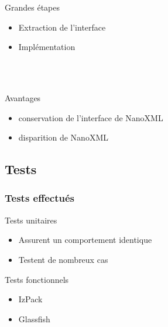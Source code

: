 \begin{frame}
\begin{minipage}[c]{.6\linewidth}
\begin{minipage}[c]{\linewidth}
\begin{beamerboxesrounded}[shadow=true]{Grandes étapes}
\begin{itemize}
	\item Extraction de l'interface
	\item Implémentation
\end{itemize}
\end{beamerboxesrounded}
\end{minipage}
~\\
~\\
\begin{minipage}[c]{\linewidth}
\begin{beamerboxesrounded}[shadow=true]{Avantages}
\begin{itemize}
	\item conservation de l'interface de NanoXML
	\item disparition de NanoXML
\end{itemize}
\end{beamerboxesrounded}
\end{minipage}
\end{minipage}
\end{frame}
\subsection{Tests}
\begin{frame}\frametitle{Tests effectués}
\begin{minipage}[c]{.9\linewidth}
\begin{beamerboxesrounded}[shadow=true]{Tests unitaires}
\begin{itemize}
	\item Assurent un comportement identique
	\item Testent de nombreux cas
\end{itemize}
\end{beamerboxesrounded}
\end{minipage}
\vfill
\begin{minipage}[c]{.9\linewidth}
\begin{beamerboxesrounded}[shadow=true]{Tests fonctionnels}
\begin{itemize}
	\item IzPack
	\item Glassfish
\end{itemize}
\end{beamerboxesrounded}
\end{minipage}
\end{frame}

